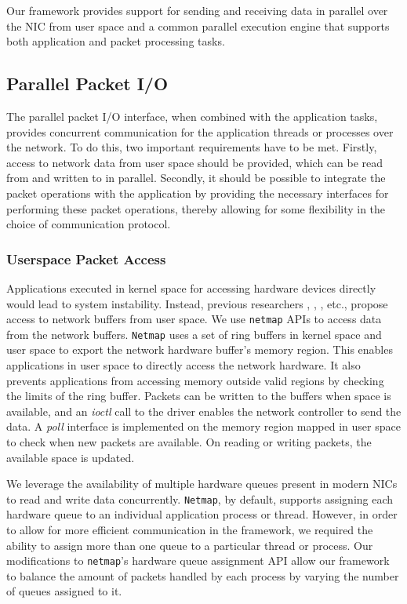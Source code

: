 \documentclass[10pt, conference, compsocconf, reqno]{IEEEtran}
\begin{document}
Our framework provides support for sending and receiving data in parallel over the NIC from user space and a common parallel execution engine that supports both application and packet processing tasks.

\subsection{Parallel Packet I/O}
\label{ppio}
The parallel packet I/O interface, when combined with the application tasks, provides concurrent communication for the application threads or processes over the network. To do this, two important requirements have to be met. Firstly, access to network data from user space should be provided, which can be read from and written to in parallel. Secondly, it should be possible to integrate the packet operations with the application by providing the necessary interfaces for performing these packet operations, thereby allowing for some flexibility in the choice of communication protocol.

\subsubsection{Userspace Packet Access}
Applications executed in kernel space for accessing hardware devices directly would lead to system instability. Instead, previous researchers \cite{Rizzo:2012:RNI:2090147.2103536}, \cite{1564468}, \cite{Krasnyansky}, etc., propose access to network buffers from user space. We use \texttt{netmap} APIs \cite{Rizzo:2012:RNI:2090147.2103536} to access data from the network buffers. \texttt{Netmap} uses a set of ring buffers in kernel space and user space to export the network hardware buffer's memory region. This enables applications in user space to directly access the network hardware. It also prevents applications from accessing memory outside valid regions by checking the limits of the ring buffer. Packets can be written to the buffers when space is available, and an \textit{ioctl} call to the driver enables the network controller to send the data. A \textit{poll} interface is implemented on the memory region mapped in user space to check when new packets are available. On reading or writing packets, the available space is updated.

We leverage the availability of multiple hardware queues present in modern NICs to read and write data concurrently. \texttt{Netmap}, by default, supports assigning each hardware queue to an individual application process or thread. However, in order to allow for more efficient communication in the framework, we required the ability to assign more than one queue to a particular thread or process. Our modifications to \texttt{netmap}'s hardware queue assignment API allow our framework to balance the amount of packets handled by each process by varying the number of queues assigned to it.
\end{document}
